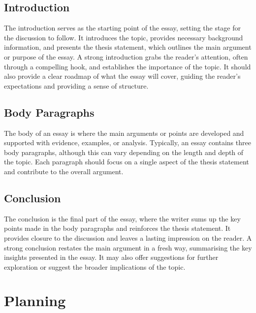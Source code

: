 \documentclass[a4paper]{article}
\begin{document}
\subsection{Introduction}
The introduction serves as the starting point of the essay, setting the stage for the discussion to follow. It introduces the topic, provides necessary background information, and presents the thesis statement, which outlines the main argument or purpose of the essay. A strong introduction grabs the reader’s attention, often through a compelling hook, and establishes the importance of the topic. It should also provide a clear roadmap of what the essay will cover, guiding the reader's expectations and providing a sense of structure.

\subsection{Body Paragraphs}
The body of an essay is where the main arguments or points are developed and supported with evidence, examples, or analysis. Typically, an essay contains three body paragraphs, although this can vary depending on the length and depth of the topic. Each paragraph should focus on a single aspect of the thesis statement and contribute to the overall argument.

\subsection{Conclusion}
The conclusion is the final part of the essay, where the writer sums up the key points made in the body paragraphs and reinforces the thesis statement. It provides closure to the discussion and leaves a lasting impression on the reader. A strong conclusion restates the main argument in a fresh way, summarising the key insights presented in the essay. It may also offer suggestions for further exploration or suggest the broader implications of the topic.
\newpage


\section{Planning}
\end{document}
